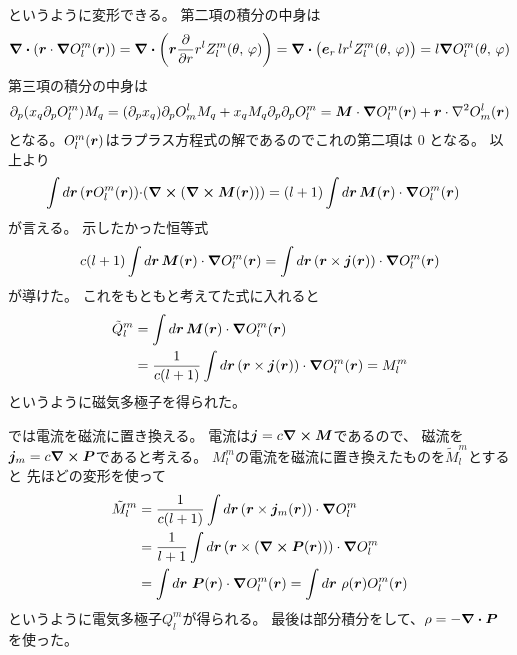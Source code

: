 \documentclass[../../master.tex]{subfiles}
\begin{document}
というように変形できる。
第二項の積分の中身は
\begin{align}
    \div(\vb*{r}\cdot \grad O_l^m(\vb*{r}))
    = \div(\vb*{r}\pdv{r} r^l Z_l^m(\theta,\,\varphi))
    = \div(\vb*{e}_r \, lr^{l} Z_l^m(\theta,\,\varphi))
    = l\grad O_l^m(\theta,\,\varphi)
\end{align}
第三項の積分の中身は
\begin{align}
    \partial_p(x_q\partial_p O_l^m) M_q
    = (\partial_p x_q) \partial_p O_m^l M_q + x_q M_q \partial_p \partial_p O_l^m
    = \vb*{M} \cdot \grad O_l^m(\vb*{r}) + \vb*{r}\cdot \laplacian O_m^l(\vb*{r})
\end{align}
となる。\(O_l^m(\vb*{r})\)はラプラス方程式の解であるのでこれの第二項は 0 となる。
以上より
\begin{align}
    \int d\vb*{r}\, (\vb*{r}O_l^m(\vb*{r}))\cdot&(\curl (\curl\vb*{M}(\vb*{r})))
    = (l+1)\int d\vb*{r}\, \vb*{M}(\vb*{r})\cdot\grad O_l^m(\vb*{r})
\end{align}
が言える。
示したかった恒等式
\begin{equation}
    c(l+1)\int d\vb*{r}\, \vb*{M}(\vb*{r})\cdot\grad O_l^m(\vb*{r})
    =\int d\vb*{r}\, (\vb*{r}\times\vb*{j}(\vb*{r}))\cdot \grad O_l^m(\vb*{r})
\end{equation}
が導けた。
これをもともと考えてた式に入れると
\begin{align}
    \tilde{Q}_l^m &= \int d\vb*{r}\, \vb*{M}(\vb*{r}) \cdot \grad O_l^m(\vb*{r}) \\
    &=\frac{1}{c(l+1)}\int d\vb*{r}\,(\vb*{r}\times \vb*{j}(\vb*{r}))\cdot \grad O_l^m(\vb*{r}) = M_l^m
\end{align}
というように磁気多極子を得られた。

では電流を磁流に置き換える。
電流は\(\vb*{j}=c\curl \vb*{M}\)であるので、
磁流を\(\vb*{j}_m=c\curl \vb*{P}\)であると考える。
\(M_l^m\)の電流を磁流に置き換えたものを\(\tilde{M}_l^m\)とすると
先ほどの変形を使って
\begin{align}
    \tilde{M}_l^m
    &= \frac{1}{c(l+1)}\int d\vb*{r}\, (\vb*{r}\times \vb*{j}_m(\vb*{r}))\cdot\grad O_l^m\\
    &= \frac{1}{l+1}\int d\vb*{r}\, (\vb*{r}\times (\curl \vb*{P}(\vb*{r}))) \cdot\grad O_l^m\\
    &= \int d\vb*{r}\, \,\vb*{P}(\vb*{r}) \cdot \grad O_l^m(\vb*{r})
    = \int d\vb*{r}\, \,\rho(\vb*{r}) O_l^m(\vb*{r})
\end{align}
というように電気多極子\(Q_l^m\)が得られる。
最後は部分積分をして、\(\rho = -\div \vb*{P}\)を使った。
\end{document}
